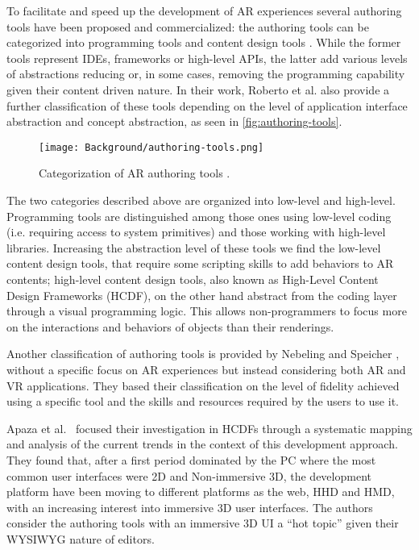 To facilitate and speed up the development of AR experiences several authoring tools have been proposed and commercialized: the authoring tools can be categorized into programming tools and content design tools \cite{marcus_authoring_2016}. While the former tools represent IDEs, frameworks or high-level APIs, the latter add various levels of abstractions reducing or, in some cases, removing the programming capability given their content driven nature.
In their work, Roberto et al. also provide a further classification of these tools depending on the level of application interface abstraction and concept abstraction, as seen in \autoref{fig:authoring-tools}.
\begin{figure}[]
	\centering
	\texttt{[image: Background/authoring-tools.png]}
	\caption{Categorization of AR authoring tools \cite{marcus_authoring_2016}.}
	\label{fig:authoring-tools}
\end{figure}
The two categories described above are organized into low-level and high-level. Programming tools are distinguished among those ones using low-level coding (i.e. requiring access to system primitives) and those working with high-level libraries.
Increasing the abstraction level of these tools we find the low-level content design tools, that require some scripting skills to add behaviors to AR contents; high-level content design tools, also known as High-Level Content Design Frameworks (HCDF), on the other hand abstract from the coding layer through a visual programming logic. This allows non-programmers to focus more on the interactions and behaviors of objects than their renderings.

Another classification of authoring tools is provided by Nebeling and Speicher \cite{nebeling_trouble_2018}, without a specific focus on AR experiences but instead considering both AR and VR applications. They based their classification on the level of fidelity achieved using a specific tool and the skills and resources required by the users to use it.

Apaza et al.~\cite{apaza_systematic_2018} focused their investigation in HCDFs through a systematic mapping and analysis of the current trends in the context of this development approach. 
They found that, after a first period dominated by the PC where the most common user interfaces were 2D and Non-immersive 3D, the development platform have been moving to different platforms as the web, HHD and HMD, with an increasing interest into immersive 3D user interfaces. The authors consider the authoring tools with an immersive 3D UI a “hot topic” given their WYSIWYG nature of editors.

